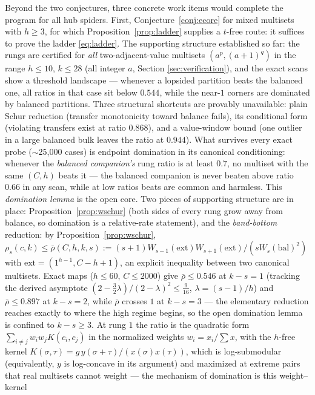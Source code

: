 \documentclass[11pt]{article}
\theoremstyle{definition}
\begin{document}
Beyond the two conjectures, three concrete work items would complete
the program for all hub spiders.  First,
Conjecture~\ref{conj:ecore} for mixed multisets with $h\ge3$, for
which Proposition~\ref{prop:ladder} supplies a $t$-free route: it
suffices to prove the ladder \eqref{eq:ladder}.  The supporting
structure established so far: the rungs are certified for
\emph{all} two-adjacent-value multisets $(a^p,(a{+}1)^q)$ in the
range $h\le10$, $k\le28$ (all integer $a$, Section
\ref{sec:verification}), and the exact scans show a threshold
landscape --- whenever a lopsided partition beats the balanced one,
all ratios in that case sit below $0.544$, while the
near-$1$ corners are dominated by balanced partitions.  Three structural shortcuts are provably unavailable: plain Schur
reduction (transfer monotonicity toward balance fails), its
conditional form (violating transfers exist at ratio $0.868$), and
a value-window bound (one outlier in a large balanced bulk leaves
the ratio at $0.944$).  What survives every exact probe
($\sim$25{,}000 cases) is endpoint domination in its canonical
conditioning: whenever the \emph{balanced companion's} rung ratio
is at least $0.7$, no multiset with the same $(C,h)$ beats it ---
the balanced companion is never beaten above ratio $0.66$ in any
scan, while at low ratios beats are common and harmless.  This
\emph{domination lemma} is the open core.  Two pieces of supporting
structure are in place: Proposition~\ref{prop:wschur} (both sides
of every rung grow away from balance, so domination is a
relative-rate statement), and the \emph{band-bottom} reduction:
by Proposition~\ref{prop:wschur},
$\rho_s(c,k)\le\bar\rho(C,h,k,s):=
(s{+}1)W_{s-1}(\mathrm{ext})W_{s+1}(\mathrm{ext})/(sW_s(\mathrm{bal})^2)$
with $\mathrm{ext}=(1^{h-1},C{-}h{+}1)$, an explicit inequality
between two canonical multisets.  Exact maps ($h\le60$, $C\le2000$)
give $\bar\rho\le0.546$ at $k-s=1$ (tracking the derived asymptote
$(2-\tfrac32\lambda)/(2-\lambda)^2\le\tfrac9{16}$,
$\lambda=(s{-}1)/h$) and $\bar\rho\le0.897$ at $k-s=2$, while
$\bar\rho$ crosses $1$ at $k-s=3$ --- the elementary reduction
reaches exactly to where the high regime begins, so the open
domination lemma is confined to $k-s\ge3$.  At rung $1$ the ratio is the quadratic form
$\sum_{i\ne j}w_iw_jK(c_i,c_j)$ in the normalized weights
$w_i=x_i/\sum x$, with the $h$-free kernel
$K(\sigma,\tau)=g\,y(\sigma{+}\tau)/(x(\sigma)x(\tau))$, which is
log-submodular (equivalently, $y$ is log-concave in its argument)
and maximized at extreme pairs that real multisets cannot weight
--- the mechanism of domination is this weight--kernel
\end{document}
